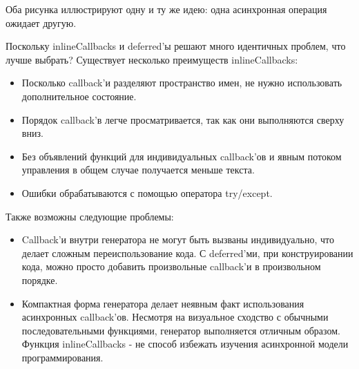 Оба рисунка иллюстрируют одну и ту же идею: 
одна асинхронная операция ожидает другую.


Поскольку inlineCallbacks и deferred'ы решают много 
идентичных проблем, что лучше выбрать? Существует 
несколько преимуществ inlineCallbacks:

\begin{itemize}

\item Посколько callback'и разделяют пространство 
    имен, не нужно использовать дополнительное состояние.

\item Порядок callback'в легче просматривается, так как они 
    выполняются сверху вниз.
    
\item Без объявлений функций для индивидуальных 
    callback'ов и явным потоком управления в общем случае получается 
    меньше текста.

\item Ошибки обрабатываются с помощью оператора try/except.

\end{itemize}

Также возможны следующие проблемы:

\begin{itemize}

\item Callback'и внутри генератора не могут быть вызваны 
    индивидуально, что делает сложным переиспользование 
    кода. С deferred'ми, при конструировании кода, можно  
    просто добавить произвольные callback'и в 
    произвольном порядке.



\item Компактная форма генератора делает неявным 
    факт использования асинхронных callback'ов. Несмотря на 
    визуальное сходство с обычными последовательными 
    функциями, генератор выполняется отличным образом. 
    Функция inlineCallbacks - не способ избежать 
    изучения асинхронной модели программирования.

\end{itemize}


